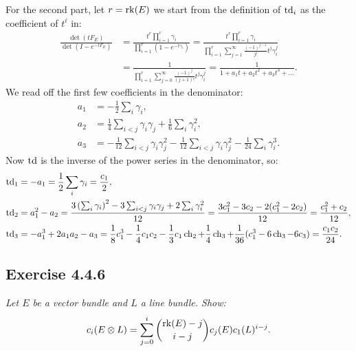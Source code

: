 \documentclass{article}
\begin{document}
For the second part, let $r = \operatorname{rk}(E)$ we start from the definition of $\operatorname{td}_i$ as the coefficient of $t^i$ in:
\begin{align*}
\frac{\det(tF_E)}{\det(I - e^{-tF_E})} &= \frac{t^r \prod_{i=1}^r \gamma_i}{\prod_{i=1}^r (1 - e^{-t\gamma_i})} 
= \frac{t^r \prod_{i=1}^r \gamma_i}{\prod_{i=1}^r \sum_{j=1}^{\infty} \frac{(-1)^{j-1}}{j!} t^j \gamma_i^j} \\
&= \frac{1}{\prod_{i=1}^r \sum_{j=0}^{\infty} \frac{(-1)^{j}}{(j+1)!} t^j \gamma_i^j}
= \frac{1}{1 + a_1 t + a_2 t^2 + a_3 t^3 + \dots} .
\end{align*}
We read off the first few coefficients in the denominator:
\begin{align*}
a_1 &= -\frac{1}{2} \sum_{i} \gamma_i, \\
a_2 &= \frac{1}{4} \sum_{i<j} \gamma_i \gamma_j + \frac{1}{6} \sum_{i} \gamma_i^2, \\
a_3 &= - \frac{1}{12} \sum_{i<j} \gamma_i \gamma_j^2 - \frac{1}{12} \sum_{i<j} \gamma_i \gamma_j^2 - 
\frac{1}{24} \sum_i \gamma_i^3.
\end{align*}
Now $\operatorname{td}$ is the inverse of the power series in the denominator, so:
\begin{align*}
\operatorname{td}_1 &= - a_1 = \frac{1}{2} \sum_i \gamma_i = \frac{c_1}{2}, \\
\operatorname{td}_2 &= a_1^2 - a_2 = \frac{3 \left(\sum_i \gamma_i\right)^2 - 3 \sum_{i<j} \gamma_i \gamma_j + 2 \sum_i \gamma_i^2}{12}
= \frac{3c_1^2 - 3c_2 - 2(c_1^2 - 2c_2)}{12} = \frac{c_1^2 + c_2}{12}, \\
\operatorname{td}_3 &= - a_1^3 + 2a_1a_2 - a_3 = \frac{1}{8} c_1^3 - \frac{1}{4} c_1c_2 - \frac{1}{3} c_1 \operatorname{ch}_2 + \frac{1}{4} \operatorname{ch}_3
+ \frac{1}{36}(c_1^3 - 6 \operatorname{ch}_3 - 6c_3) = \frac{c_1c_2}{24}.
\end{align*}



\subsection*{Exercise 4.4.6}
\emph{Let $E$ be a vector bundle and $L$ a line bundle. Show:}
\[	c_i(E \otimes L) = \sum_{j=0}^i \binom{\operatorname{rk}(E) - j}{i-j} c_j(E) c_1(L)^{i-j} .	\]
\vspace{3mm}
\end{document}
